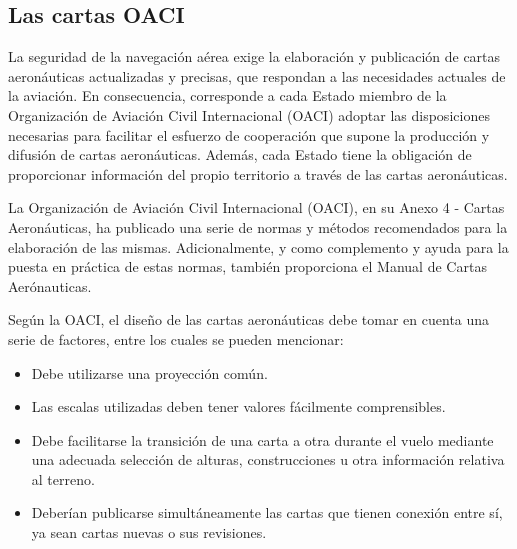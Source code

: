 \documentclass[a4paper,12pt,twoside]{article}
\begin{document}
\subsection{Las cartas OACI \cite{Salazar_nav_aerea}}

La seguridad de la navegaci\'on a\'erea exige la elaboraci\'on y publicaci\'on de cartas aeron\'auticas actualizadas y precisas, que respondan a las necesidades actuales de la aviaci\'on. En consecuencia, corresponde a cada Estado miembro de la Organizaci\'on de Aviaci\'on Civil Internacional (OACI) adoptar las disposiciones necesarias para facilitar el esfuerzo de cooperaci\'on que supone la producci\'on y difusi\'on de cartas aeron\'auticas. Adem\'as, cada Estado tiene la obligaci\'on de proporcionar informaci\'on del propio territorio a trav\'es de las cartas aeron\'auticas.

La Organizaci\'on de Aviaci\'on Civil Internacional (OACI), en su Anexo 4 - Cartas Aeron\'auticas, ha publicado una serie de normas y m\'etodos recomendados para la elaboraci\'on de las mismas. Adicionalmente, y como complemento y ayuda para la puesta en pr\'actica de estas normas, tambi\'en proporciona el Manual de Cartas Aer\'onauticas.

Seg\'un la OACI, el dise\~no de las cartas aeron\'auticas debe tomar en cuenta una serie de factores, entre los cuales se pueden mencionar:

\begin{itemize}

\item  Debe utilizarse una proyecci\'on com\'un.

  \item Las escalas utilizadas deben tener valores f\'acilmente
  comprensibles.

  \item Debe facilitarse la transici\'on de una carta a otra durante el
  vuelo mediante una adecuada selecci\'on de alturas, construcciones u
  otra informaci\'on relativa al terreno.

  \item Deber\'ian publicarse simult\'aneamente las cartas que tienen conexi\'on
  entre s\'i, ya sean cartas nuevas o sus revisiones.

\end{itemize}

\begin{landscape}
  
\end{landscape}
\end{document}
